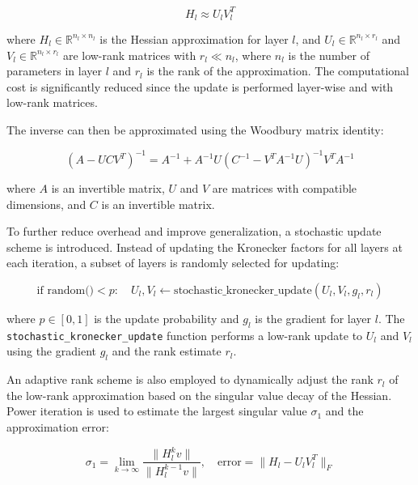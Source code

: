\documentclass[a4paper,11pt]{article}
\begin{document}
\begin{equation}
    H_l \approx U_l V_l^T
    \label{eq:hessian_approx}
\end{equation}

where \(H_l \in \mathbb{R}^{n_l \times n_l}\) is the Hessian approximation for layer \(l\), and \(U_l \in \mathbb{R}^{n_l \times r_l}\) and \(V_l \in \mathbb{R}^{n_l \times r_l}\) are low-rank matrices with \(r_l \ll n_l\), where \(n_l\) is the number of parameters in layer \(l\) and \(r_l\) is the rank of the approximation. The computational cost is significantly reduced since the update is performed layer-wise and with low-rank matrices.

The inverse can then be approximated using the Woodbury matrix identity:

\begin{equation}
    (A - UCV^T)^{-1} = A^{-1} + A^{-1}U(C^{-1} - V^TA^{-1}U)^{-1}V^TA^{-1}
\end{equation}

where \(A\) is an invertible matrix, \(U\) and \(V\) are matrices with compatible dimensions, and \(C\) is an invertible matrix.

To further reduce overhead and improve generalization, a stochastic update scheme is introduced. Instead of updating the Kronecker factors for all layers at each iteration, a subset of layers is randomly selected for updating:

\begin{equation}
    \text{if } \text{random()} < p: \quad U_l, V_l \leftarrow \text{stochastic\_kronecker\_update}(U_l, V_l, g_l, r_l)
    \label{eq:stochastic_update}
\end{equation}

where \(p \in [0, 1]\) is the update probability and \(g_l\) is the gradient for layer \(l\). The \texttt{stochastic\_kronecker\_update} function performs a low-rank update to \(U_l\) and \(V_l\) using the gradient \(g_l\) and the rank estimate \(r_l\).

An adaptive rank scheme is also employed to dynamically adjust the rank \(r_l\) of the low-rank approximation based on the singular value decay of the Hessian. Power iteration is used to estimate the largest singular value \(\sigma_1\) and the approximation error:

\begin{equation}
    \sigma_1 = \lim_{k \to \infty} \frac{\|H_l^k v\|}{\|H_l^{k-1} v\|}, \quad \text{error} = \|H_l - U_l V_l^T\|_F
\end{equation}
\end{document}
